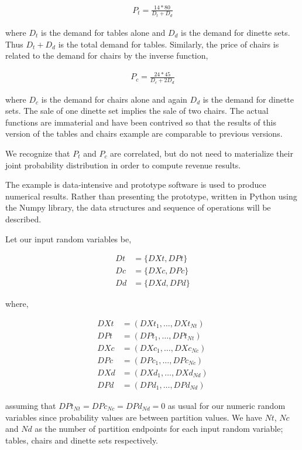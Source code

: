 \begin{align*}
P_t = \frac{14*80}{D_t + D_d}
\end{align*}

where $D_t$ is the demand for tables alone and $D_d$ is the demand for dinette sets. Thus $D_t + D_d$ is the total demand for tables. Similarly, the price of chairs is related to the demand for chairs by the inverse function,

\begin{align*}
P_c = \frac{24*45}{D_c + 2D_d}
\end{align*}

where $D_c$ is the demand for chairs alone and again $D_d$ is the demand for dinette sets. The sale of one dinette set implies the sale of two chairs. The actual functions are immaterial and have been contrived so that the results of this version of the tables and chairs example are comparable to previous versions. 

We recognize that $P_t$ and $P_c$ are correlated, but do not need to materialize their joint probability distribution in order to compute revenue results.

The example is data-intensive and prototype software is used to produce numerical results. Rather than presenting the prototype, written in Python using the Numpy library, the data structures and sequence of operations will be described.

Let our input random variables be,

\begin{align*}
Dt &= \{DXt, DPt\}\\
Dc &= \{DXc, DPc\}\\
Dd &= \{DXd, DPd\}
\end{align*}

where,

\begin{align*}
DXt &= (DXt_1, \dots, DXt_{Nt})\\
DPt &= (DPt_1, \dots, DPt_{Nt})\\
DXc &= (DXc_1, \dots, DXc_{Nc})\\
DPc &= (DPc_1, \dots, DPc_{Nc})\\
DXd &= (DXd_1, \dots, DXd_{Nd})\\
DPd &= (DPd_1, \dots, DPd_{Nd})
\end{align*}

assuming that $DPt_{Nt} = DPc_{Nc} = DPd_{Nd} = 0$ as usual for our numeric random variables since probability values are between partition values. We have $Nt$, $Nc$ and $Nd$ as the number of partition endpoints for each input random variable; tables, chairs and dinette sets respectively.

